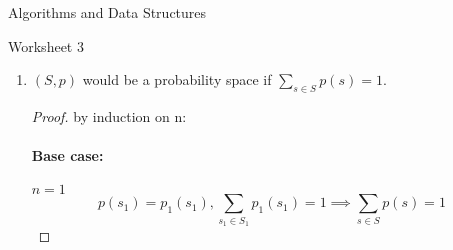 \documentclass{article}
\begin{document}
    {Algorithms and Data Structures}

    \begin{center}
        \large
        Worksheet 3
    \end{center}
    \begin{tasks}
        \item {
            \begin{enumerate}
                \item {
                    \((S, p)\) would be a probability space if \(\sum_{s\in S}p(s) = 1\). 
                    \begin{proof}
                        by induction on n:
                        \paragraph*{Base case:} \(n = 1\)
                        \begin{displaymath}
                            p(s_1) = p_1(s_1), \sum_{s_1\in S_1}p_1(s_1) = 1 \implies \sum_{s\in S}p(s) = 1
                        \end{displaymath}

\end{proof}}
\end{enumerate}}
\end{tasks}
\end{document}
